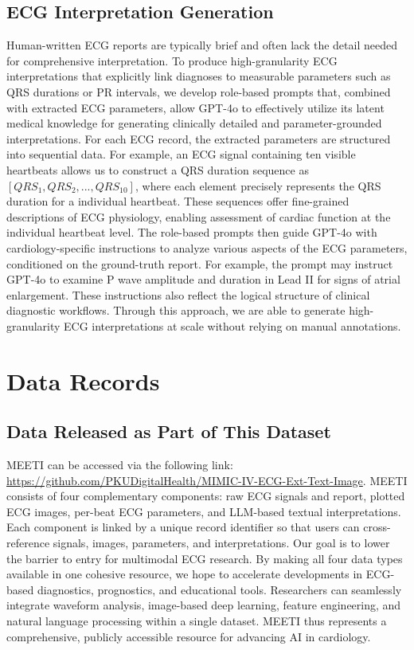 \documentclass[12pt,letterpaper]{article}
\begin{document}
\subsection*{ECG Interpretation Generation}

Human-written ECG reports are typically brief and often lack the detail needed for comprehensive interpretation.
% 
To produce high-granularity ECG interpretations that explicitly link diagnoses to measurable parameters such as QRS durations or PR intervals, we develop role-based prompts that, combined with extracted ECG parameters, allow GPT-4o \cite{achiam2023gpt} to effectively utilize its latent medical knowledge for generating clinically detailed and parameter-grounded interpretations.
% 
For each ECG record, the extracted parameters are structured into sequential data. For example, an ECG signal containing ten visible heartbeats allows us to construct a QRS duration sequence as \([QRS_1, QRS_2, ..., QRS_{10}]\), where each element precisely represents the QRS duration for a individual heartbeat. These sequences offer fine-grained descriptions of ECG physiology, enabling assessment of cardiac function at the individual heartbeat level.
% 
The role-based prompts then guide GPT-4o \cite{achiam2023gpt} with cardiology-specific instructions to analyze various aspects of the ECG parameters, conditioned on the ground-truth report. For example, the prompt may instruct GPT-4o \cite{achiam2023gpt} to examine P wave amplitude and duration in Lead II for signs of atrial enlargement. These instructions also reflect the logical structure of clinical diagnostic workflows.
% 
Through this approach, we are able to generate high-granularity ECG interpretations at scale without relying on manual annotations.

\section*{Data Records}

\subsection*{Data Released as Part of This Dataset}

MEETI can be accessed via the following link: \url{https://github.com/PKUDigitalHealth/MIMIC-IV-ECG-Ext-Text-Image}. MEETI consists of four complementary components: raw ECG signals and report, plotted ECG images, per-beat ECG parameters, and LLM-based textual interpretations. Each component is linked by a unique record identifier so that users can cross-reference signals, images, parameters, and interpretations. Our goal is to lower the barrier to entry for multimodal ECG research. By making all four data types available in one cohesive resource, we hope to accelerate developments in ECG-based diagnostics, prognostics, and educational tools. Researchers can seamlessly integrate waveform analysis, image-based deep learning, feature engineering, and natural language processing within a single dataset. MEETI thus represents a comprehensive, publicly accessible resource for advancing AI in cardiology.
\end{document}
